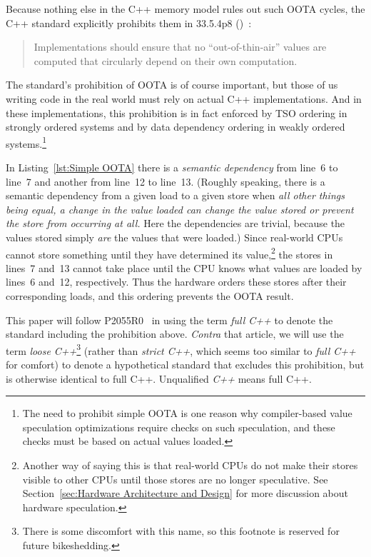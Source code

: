 \documentclass[10]{article}
\begin{document}
Because nothing else in the C++ memory model rules out such OOTA cycles,
the C++ standard explicitly prohibits them in 33.5.4p8
()~\cite{ThomasKoeppe2023N4950}:
\begin{quote}
	Implementations should ensure that no “out-of-thin-air” values
	are computed that circularly depend on their own computation.
\end{quote}
The standard's prohibition of OOTA is of course important, but those of us
writing code in the real world must rely on actual C++ implementations.
And in these implementations, this prohibition is in fact enforced by TSO
ordering in strongly ordered systems and by data dependency ordering in
weakly ordered systems.\footnote{
	The need to prohibit simple OOTA is one reason why compiler-based
	value speculation optimizations require checks on such
	speculation, and these checks must be based on actual values
	loaded.}

In Listing~\ref{lst:Simple OOTA}
there is a \emph{semantic dependency} from line~6 to line~7 and
another from line~12 to line~13.
(Roughly speaking, there is a semantic dependency from a given load
to a given store when \emph{all other things being equal, a change in the
value loaded can change the value stored or prevent the store from
occurring at all.}
Here the dependencies are trivial, because the values stored simply
\emph{are} the values that were loaded.)
Since real-world CPUs cannot store something
until they have determined its value,\footnote{
	Another way of saying this is that real-world CPUs do not
	make their stores visible to other CPUs until those stores
	are no longer speculative.
	See Section~\ref{sec:Hardware Architecture and Design}
	for more discussion about hardware speculation.}
the stores in lines~7 and~13 cannot take place until the CPU
knows what values are loaded by lines~6 and~12, respectively.
Thus the hardware orders these stores after their corresponding loads,
and this ordering prevents the OOTA result.

This paper will follow P2055R0~\cite{PaulEMcKenney2020RelaxedGuideRelaxed}
in using the term \emph{full C++} to denote the standard including the
prohibition above.
{\it Contra\/} that article, we will use the term \emph{loose C++}\footnote{
	There is some discomfort with this name, so this footnote
	is reserved for future bikeshedding.}
(rather than \emph{strict C++}, which seems too similar to
\emph{full C++} for comfort)
to denote a hypothetical standard that excludes this prohibition, but
is otherwise identical to full C++.
Unqualified \emph{C++} means full C++.
\end{document}
